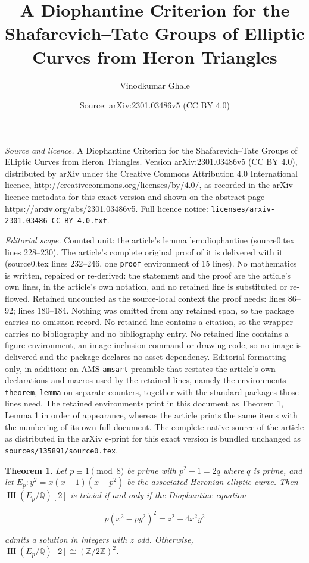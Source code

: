 \documentclass[10pt,a4paper]{amsart}
\title{A Diophantine Criterion for the Shafarevich--Tate Groups of Elliptic Curves from Heron Triangles}
\author{Vinodkumar Ghale}
\date{Source: arXiv:2301.03486v5 (CC BY 4.0)}
\newtheorem{theorem}{Theorem}
\DeclareMathOperator{\III}{III}
\begin{document}
\maketitle

\noindent\emph{Source and licence.} A Diophantine Criterion for the Shafarevich--Tate Groups of Elliptic Curves from Heron Triangles. Version arXiv:2301.03486v5 (CC BY 4.0), distributed by arXiv under the Creative Commons Attribution 4.0 International licence, http://creativecommons.org/licenses/by/4.0/, as recorded in the arXiv licence metadata for this exact version and shown on the abstract page https://arxiv.org/abs/2301.03486v5. Full licence notice: \texttt{licenses/arxiv-2301.03486-CC-BY-4.0.txt}.\par\smallskip

\noindent\textit{Editorial scope.} Counted unit: the article's lemma lem:diophantine (source0.tex lines 228--230). The article's complete original proof of it is delivered with it (source0.tex lines 232--246, one \texttt{proof} environment of 15 lines). No mathematics is written, repaired or re-derived: the statement and the proof are the article's own lines, in the article's own notation, and no retained line is substituted or re-flowed.  Retained uncounted as the source-local context the proof needs: lines 86--92; lines 180--184.  Nothing was omitted from any retained span, so the package carries no omission record.  No retained line contains a citation, so the wrapper carries no bibliography and no bibliography entry.  No retained line contains a figure environment, an image-inclusion command or drawing code, so no image is delivered and the package declares no asset dependency.  Editorial formatting only, in addition: an AMS \texttt{amsart} preamble that restates the article's own declarations and macros used by the retained lines, namely the environments \texttt{theorem}, \texttt{lemma} on separate counters, together with the standard packages those lines need.  The retained environments print in this document as Theorem 1, Lemma 1 in order of appearance, whereas the article prints the same items with the numbering of its own full document.  The complete native source of the article as distributed in the arXiv e-print for this exact version is bundled unchanged as \texttt{sources/135891/source0.tex}.
\begin{theorem}\label{thm:main}
Let \(p \equiv 1 \pmod{8}\) be prime with \(p^{2} + 1 = 2q\) where \(q\) is prime, and let \(E_{p}: y^{2} = x(x - 1)(x + p^{2})\) be the associated Heronian elliptic curve. Then \(\III(E_{p}/\mathbb{Q})[2]\) is trivial if and only if the Diophantine equation

\[p(x^{2} - py^{2})^{2} = z^{2} + 4x^{2}y^{2}\]

admits a solution in integers with \(z\) odd. Otherwise, \(\III(E_{p}/\mathbb{Q})[2] \cong (\mathbb{Z}/2\mathbb{Z})^{2}\).
\end{theorem}
\end{document}
